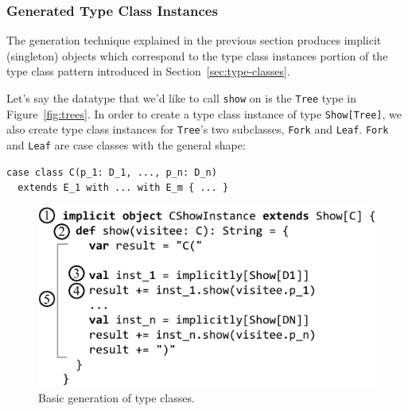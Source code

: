 \documentclass[preprint,nocopyrightspace]{sigplanconf}
\begin{document}

\subsubsection{Generated Type Class Instances}
\label{sec:generated-type-class-instances}

The generation technique explained in the previous section produces implicit
(singleton) objects which correspond to the type class instances portion of the
type class pattern introduced in Section~\ref{sec:type-classes}.

Let's say the datatype that we'd like to call \verb|show| on is the
\lstinline{Tree} type in Figure~\ref{fig:trees}.
In order to create a type class instance of type
\verb|Show[Tree]|, we also create type class instances for
\verb|Tree|'s two subclasses, \verb|Fork| and \verb|Leaf|.
\verb|Fork| and \verb|Leaf| are case classes with the general
shape:

\begin{lstlisting}
case class C(p_1: D_1, ..., p_n: D_n)
  extends E_1 with ... with E_m { ... }
\end{lstlisting}
\noindent

\begin{figure}
\centering
\includegraphics[width=0.87\columnwidth]{basic-generation.pdf}
\caption{Basic generation of type classes.}
\label{fig:basic-generation}
\end{figure}
\end{document}
